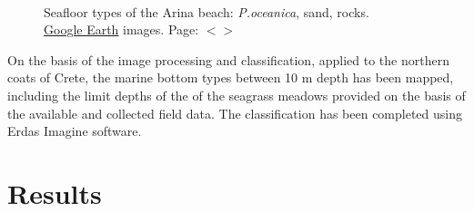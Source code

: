 \documentclass[11pt]{article}
\begin{document}
\begin{figure}
	\centering
	\\
	\caption{Seafloor types of the Arina beach: \textit{P.oceanica}, sand, rocks. \\ \href{http://www.google.com/earth/index.html}{Google Earth} images. Page: $<$\pageref{page-48}$>$}
	\label{fig:38}
\end{figure}

On the basis of the image processing and classification, applied to the northern coats of Crete, the
marine bottom types between 10 m depth has been mapped, including the limit depths of the of the
seagrass meadows provided on the basis of the available and collected field data. The classification
has been completed using Erdas Imagine software.

\section{Results}\label{sec:4}

%
\end{document}
